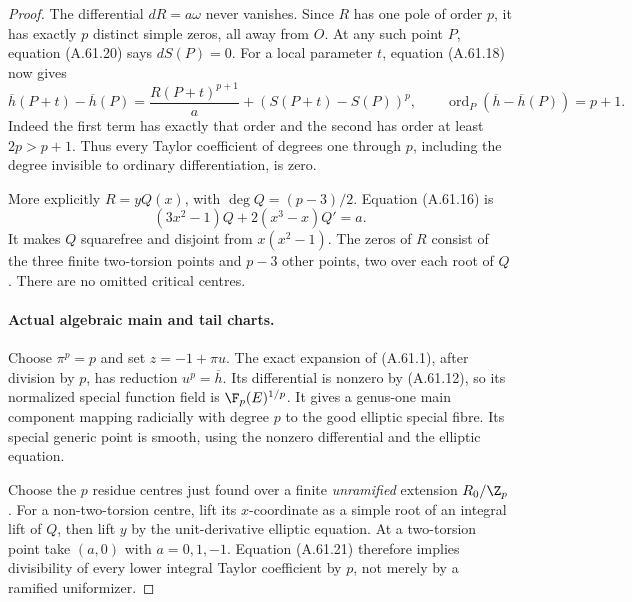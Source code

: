\begin{proof}
The differential \(dR=a\omega\) never vanishes.
Since \(R\) has one pole of order \(p\), it has
exactly \(p\) distinct simple zeros, all away from
\(O\). At any such point \(P\), equation
(A.61.20) says \(dS(P)=0\). For a local parameter
\(t\), equation (A.61.18) now gives
\[
 \overline h(P+t)-\overline h(P)
       =\frac{R(P+t)^{p+1}}a
          +(S(P+t)-S(P))^p,
 \qquad \operatorname{ord}_P(\overline h-\overline h(P))=p+1.
                                                        \tag{A.61.21}
\]
Indeed the first term has exactly that order and
the second has order at least \(2p>p+1\).
Thus every Taylor coefficient of degrees one
through \(p\), including the degree invisible
to ordinary differentiation, is zero.

More explicitly \(R=yQ(x)\), with
\(\deg Q=(p-3)/2\). Equation (A.61.16) is
\[
       (3x^2-1)Q+2(x^3-x)Q'=a.                         \tag{A.61.22}
\]
It makes \(Q\) squarefree and disjoint from
\(x(x^2-1)\). The zeros of \(R\) consist of
the three finite two-torsion points and
\(p-3\) other points, two over each root of
\(Q\). There are no omitted critical centres.

\paragraph{Actual algebraic main and tail charts.}
Choose \(\pi^p=p\) and set \(z=-1+\pi u\).
The exact expansion of (A.61.1), after division
by \(p\), has reduction \(u^p=\overline h\).
Its differential is nonzero by (A.61.12), so its
normalized special function field is
\(\F_p(E)^{1/p}\). It gives a genus-one main
component mapping radicially with degree \(p\)
to the good elliptic special fibre. Its special
generic point is smooth, using the nonzero
differential and the elliptic equation.

Choose the \(p\) residue centres just found over
a finite \emph{unramified} extension \(R_0/\Z_p\).
For a non-two-torsion centre, lift its \(x\)-coordinate
as a simple root of an integral lift of \(Q\), then
lift \(y\) by the unit-derivative elliptic equation.
At a two-torsion point take \((a,0)\) with
\(a=0,1,-1\). Equation (A.61.21) therefore implies
divisibility of every lower integral Taylor
coefficient by \(p\), not merely by a ramified
uniformizer.


\end{proof}
